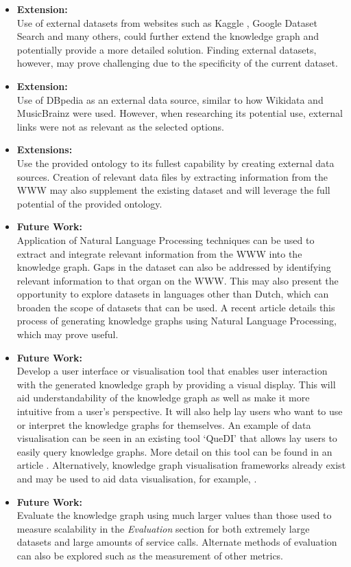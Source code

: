 \begin{itemize}
    \item \textbf{Extension:} \\ Use of external datasets from websites such as Kaggle \cite{kaggle}, Google Dataset Search \cite{googledatasetsearch} and many others, could further extend the knowledge graph and potentially provide a more detailed solution. Finding external datasets, however, may prove challenging due to the specificity of the current dataset. 
    \item \textbf{Extension:} \\ Use of DBpedia \cite{organdbpedia} as an external data source, similar to how Wikidata and MusicBrainz were used. However, when researching its potential use, external links were not as relevant as the selected options. 
    \item \textbf{Extensions:} \\ Use the provided ontology to its fullest capability by creating external data sources. Creation of relevant data files by extracting information from the WWW may also supplement the existing dataset and will leverage the full potential of the provided ontology. 
    \item \textbf{Future Work:} \\ Application of Natural Language Processing techniques can be used to extract and integrate relevant information from the WWW into the knowledge graph. Gaps in the dataset can also be addressed by identifying relevant information to that organ on the WWW. This may also present the opportunity to explore datasets in languages other than Dutch, which can broaden the scope of datasets that can be used. A recent article \cite{DESSI2021253} details this process of generating knowledge graphs using Natural Language Processing, which may prove useful. 
    \item \textbf{Future Work:} \\ Develop a user interface or visualisation tool that enables user interaction with the generated knowledge graph by providing a visual display. This will aid understandability of the knowledge graph as well as make it more intuitive from a user's perspective. It will also help lay users who want to use or interpret the knowledge graphs for themselves. An example of data visualisation can be seen in an existing tool `QueDI' that allows lay users to easily query knowledge graphs. More detail on this tool can be found in an article \cite{de2020quedi}. Alternatively, knowledge graph visualisation frameworks already exist and may be used to aid data visualisation, for example, \cite{9355442}.
    \item \textbf{Future Work:} \\ Evaluate the knowledge graph using much larger values than those used to measure scalability in the \textit{Evaluation} section for both extremely large datasets and large amounts of service calls. Alternate methods of evaluation can also be explored such as the measurement of other metrics.
\end{itemize}


